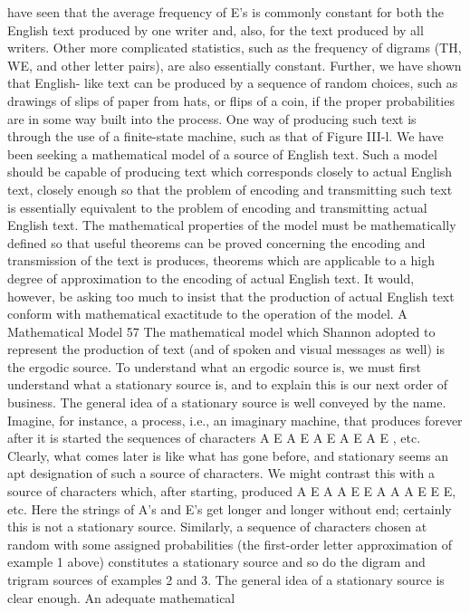 have seen that the average frequency of E’s is commonly constant
for both the English text produced by one writer and, also, for the
text produced by all writers. Other more complicated statistics,
such as the frequency of digrams (TH, WE, and other letter pairs),
are also essentially constant. Further, we have shown that English-
like text can be produced by a sequence of random choices, such
as drawings of slips of paper from hats, or flips of a coin, if the
proper probabilities are in some way built into the process. One
way of producing such text is through the use of a finite-state
machine, such as that of Figure III-l.
We have been seeking a mathematical model of a source of
English text. Such a model should be capable of producing text
which corresponds closely to actual English text, closely enough
so that the problem of encoding and transmitting such text is
essentially equivalent to the problem of encoding and transmitting
actual English text. The mathematical properties of the model must
be mathematically defined so that useful theorems can be proved
concerning the encoding and transmission of the text is produces,
theorems which are applicable to a high degree of approximation
to the encoding of actual English text. It would, however, be asking
too much to insist that the production of actual English text conform
with mathematical exactitude to the operation of the model.
A Mathematical Model 57
The mathematical model which Shannon adopted to represent
the production of text (and of spoken and visual messages as well)
is the ergodic source. To understand what an ergodic source is, we
must first understand what a stationary source is, and to explain
this is our next order of business.
The general idea of a stationary source is well conveyed by the
name. Imagine, for instance, a process, i.e., an imaginary machine,
that produces forever after it is started the sequences of characters
A E A E A E A E A E , etc.
Clearly, what comes later is like what has gone before, and
stationary seems an apt designation of such a source of characters.
We might contrast this with a source of characters which, after
starting, produced
A E A A E E A A A E E E, etc.
Here the strings of A’s and E’s get longer and longer without end;
certainly this is not a stationary source.
Similarly, a sequence of characters chosen at random with some
assigned probabilities (the first-order letter approximation of example
1 above) constitutes a stationary source and so do the
digram and trigram sources of examples 2 and 3. The general idea
of a stationary source is clear enough. An adequate mathematical
